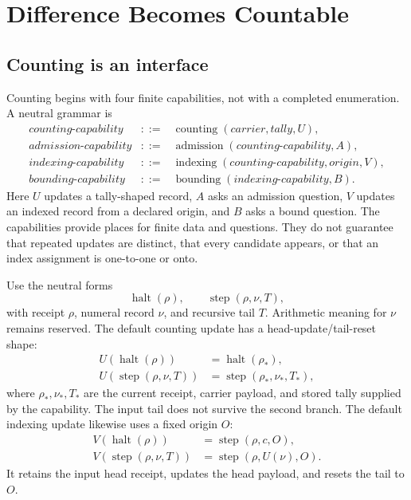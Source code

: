 \chapter{Difference Becomes Countable}

\section{Counting is an interface}

Counting begins with four finite capabilities, not with a completed enumeration.  A neutral grammar is
\[
\begin{array}{rcl}
\textit{counting-capability}&::=&
 \operatorname{counting}(\textit{carrier},\textit{tally},U),\\
\textit{admission-capability}&::=&
 \operatorname{admission}(\textit{counting-capability},A),\\
\textit{indexing-capability}&::=&
 \operatorname{indexing}(\textit{counting-capability},\textit{origin},V),\\
\textit{bounding-capability}&::=&
 \operatorname{bounding}(\textit{indexing-capability},B).
\end{array}
\]
Here \(U\) updates a tally-shaped record, \(A\) asks an admission question, \(V\) updates an indexed record from a
declared origin, and \(B\) asks a bound question.  The capabilities provide places for finite data and questions.
They do not guarantee that repeated updates are distinct, that every candidate appears, or that an index assignment is
one-to-one or onto.

Use the neutral forms
\[
 \operatorname{halt}(\rho),\qquad
 \operatorname{step}(\rho,\nu,T),
\]
with receipt \(\rho\), numeral record \(\nu\), and recursive tail \(T\).  Arithmetic meaning for \(\nu\) remains
reserved.  The default counting update has a head-update/tail-reset shape:
\[
\begin{aligned}
 U(\operatorname{halt}(\rho))
   &=\operatorname{halt}(\rho_*),\\
 U(\operatorname{step}(\rho,\nu,T))
   &=\operatorname{step}(\rho_*,\nu_*,T_*),
\end{aligned}
\]
where \(\rho_*,\nu_*,T_*\) are the current receipt, carrier payload, and stored tally supplied by the capability.  The
input tail does not survive the second branch.  The default indexing update likewise uses a fixed origin \(O\):
\[
\begin{aligned}
 V(\operatorname{halt}(\rho))
   &=\operatorname{step}(\rho,c,O),\\
 V(\operatorname{step}(\rho,\nu,T))
   &=\operatorname{step}(\rho,U(\nu),O).
\end{aligned}
\]
It retains the input head receipt, updates the head payload, and resets the tail to \(O\).


